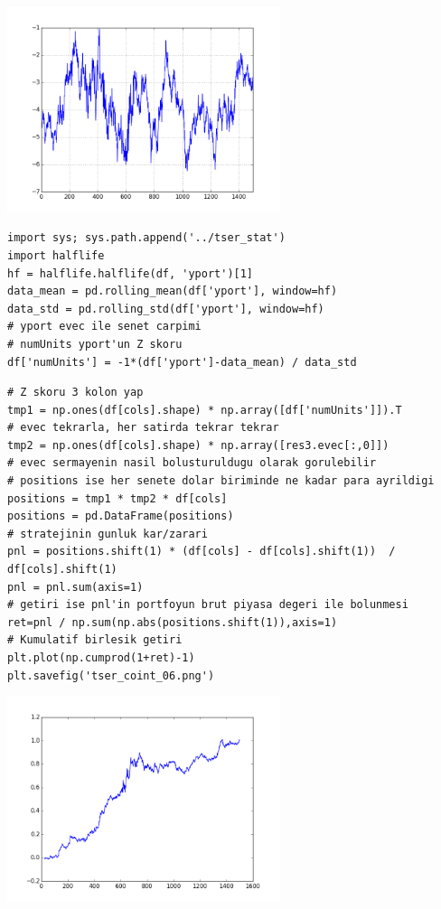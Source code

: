 \documentclass[12pt,fleqn]{article}\usepackage{../../common}
\begin{document}
\includegraphics[height=6cm]{tser_coint_05.png}

\begin{verbatim}
import sys; sys.path.append('../tser_stat')
import halflife
hf = halflife.halflife(df, 'yport')[1]
data_mean = pd.rolling_mean(df['yport'], window=hf)
data_std = pd.rolling_std(df['yport'], window=hf)
# yport evec ile senet carpimi
# numUnits yport'un Z skoru
df['numUnits'] = -1*(df['yport']-data_mean) / data_std
\end{verbatim}

\begin{verbatim}
# Z skoru 3 kolon yap
tmp1 = np.ones(df[cols].shape) * np.array([df['numUnits']]).T
# evec tekrarla, her satirda tekrar tekrar
tmp2 = np.ones(df[cols].shape) * np.array([res3.evec[:,0]])
# evec sermayenin nasil bolusturuldugu olarak gorulebilir
# positions ise her senete dolar biriminde ne kadar para ayrildigi
positions = tmp1 * tmp2 * df[cols]
positions = pd.DataFrame(positions)
# stratejinin gunluk kar/zarari
pnl = positions.shift(1) * (df[cols] - df[cols].shift(1))  / df[cols].shift(1)
pnl = pnl.sum(axis=1)
# getiri ise pnl'in portfoyun brut piyasa degeri ile bolunmesi
ret=pnl / np.sum(np.abs(positions.shift(1)),axis=1)
# Kumulatif birlesik getiri
plt.plot(np.cumprod(1+ret)-1)
plt.savefig('tser_coint_06.png')
\end{verbatim}

\includegraphics[height=6cm]{tser_coint_06.png}
\end{document}
